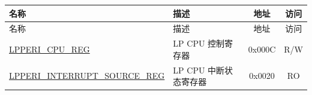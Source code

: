 \begin{longtable}{ | p{6.0cm} | p{6.4cm} | c | c| }
\hline\rowcolor{lightgray}
名称 & 描述 & 地址 & 访问 \\ \hline
\endfirsthead
\hline
\rowcolor{lightgray}
名称 & 描述 & 地址 & 访问\\
\hline
\endhead
\endfoot
\hyperref[regdesc:LPPERICPUREG]{LPPERI\_CPU\_REG} & LP CPU 控制寄存器 & 0x000C & R/W \\\hline
\hyperref[regdesc:LPPERIINTERRUPTSOURCEREG]{LPPERI\_INTERRUPT\_SOURCE\_REG} & LP CPU 中断状态寄存器 & 0x0020 & RO \\\hline

\end{longtable}
